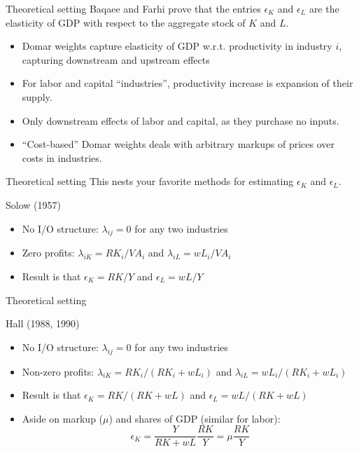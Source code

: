 \documentclass[10pt, xcolor=dvipsnames]{beamer}
\begin{document}
\begin{frame}{Theoretical setting}
Baqaee and Farhi prove that the entries $\epsilon_K$ and $\epsilon_L$ are the elasticity of GDP with respect to the aggregate stock of $K$ and $L$. 

\begin{itemize}
  \item Domar weights capture elasticity of GDP w.r.t. productivity in industry $i$, capturing downstream and upstream effects
  \item For labor and capital ``industries'', productivity increase is expansion of their supply.
  \item Only downstream effects of labor and capital, as they purchase no inputs.
  \item ``Cost-based'' Domar weights deals with arbitrary markups of prices over costs in industries. 
\end{itemize}

\end{frame}

\begin{frame}{Theoretical setting}
This nests your favorite methods for estimating $\epsilon_K$ and $\epsilon_L$.
\vspace{.25in}

Solow (1957)
\begin{itemize}
  \item No I/O structure: $\lambda_{ij} = 0$ for any two industries
  \item Zero profits: $\lambda_{iK} = RK_i/VA_i$ and $\lambda_{iL} = wL_i/VA_i$
  \item Result is that $\epsilon_K = RK/Y$ and $\epsilon_L = wL/Y$
\end{itemize}

\end{frame}

\begin{frame}{Theoretical setting}

Hall (1988, 1990)
\begin{itemize}
  \item No I/O structure: $\lambda_{ij} = 0$ for any two industries
  \item Non-zero profits: $\lambda_{iK} = RK_i/(RK_i + wL_i)$ and $\lambda_{iL} = wL_i/(RK_i + wL_i)$
  \item Result is that $\epsilon_K = RK/(RK+wL)$ and $\epsilon_L = wL/(RK+wL)$
  \item Aside on markup ($\mu$) and shares of GDP (similar for labor):
    \begin{equation}
      \epsilon_K = \frac{Y}{RK+wL}\frac{RK}{Y} = \mu \frac{RK}{Y}
    \end{equation}
\end{itemize}

\end{frame}
\end{document}
